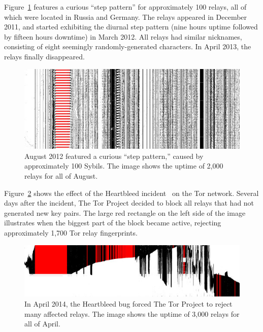 Figure~\ref{fig:2012-08-steppattern} features a curious ``step pattern'' for
approximately 100 relays, all of which were located in Russia and Germany.  The
relays appeared in December 2011, and started exhibiting the diurnal step
pattern (nine hours uptime followed by fifteen hours downtime) in March 2012.
All relays had similar nicknames, consisting of eight seemingly
randomly-generated characters.  In April 2013, the relays finally disappeared.

\begin{figure}[t]
	\centering
	\includegraphics[width=\linewidth]{diagrams/2012-08.jpg}
	\caption{August 2012 featured a curious ``step pattern,'' caused by
	approximately 100 Sybils.  The image shows the uptime of 2,000 relays for
	all of August.}
	\label{fig:2012-08-steppattern}
\end{figure}

Figure~\ref{fig:2014-04-heartbleed} shows the effect of the Heartbleed
incident~\cite{Durumeric2014a} on the Tor network.  Several days after the
incident, The Tor Project decided to block all relays that had not generated new
key pairs.  The large red rectangle on the left side of the image illustrates
when the biggest part of the block became active, rejecting approximately 1,700
Tor relay fingerprints.

\begin{figure}[t]
	\centering
	\includegraphics[width=\linewidth]{diagrams/2014-04.jpg}
	\caption{In April 2014, the Heartbleed bug forced The Tor Project to reject
	many affected relays.  The image shows the uptime of 3,000 relays for all of
	April.}
	\label{fig:2014-04-heartbleed}
\end{figure}

